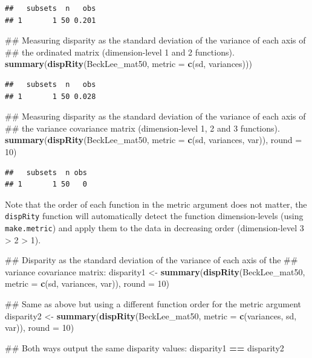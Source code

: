 \documentclass[]{book}
\newenvironment{Shaded}{\begin{snugshade}}{\end{snugshade}}
\newcommand{\KeywordTok}[1]{\textcolor[rgb]{0.13,0.29,0.53}{\textbf{#1}}}
\newcommand{\DataTypeTok}[1]{\textcolor[rgb]{0.13,0.29,0.53}{#1}}
\newcommand{\DecValTok}[1]{\textcolor[rgb]{0.00,0.00,0.81}{#1}}
\newcommand{\StringTok}[1]{\textcolor[rgb]{0.31,0.60,0.02}{#1}}
\newcommand{\OperatorTok}[1]{\textcolor[rgb]{0.81,0.36,0.00}{\textbf{#1}}}
\newcommand{\NormalTok}[1]{#1}
\theoremstyle{definition}
\theoremstyle{definition}
\theoremstyle{remark}
\begin{document}
\begin{verbatim}
##   subsets  n   obs
## 1       1 50 0.201
\end{verbatim}

\begin{Shaded}
\begin{Highlighting}[]
\NormalTok{## Measuring disparity as the standard deviation of the variance of each axis of}
\NormalTok{## the ordinated matrix (dimension-level 1 and 2 functions).}
\KeywordTok{summary}\NormalTok{(}\KeywordTok{dispRity}\NormalTok{(BeckLee_mat50, }\DataTypeTok{metric =} \KeywordTok{c}\NormalTok{(sd, variances)))}
\end{Highlighting}
\end{Shaded}

\begin{verbatim}
##   subsets  n   obs
## 1       1 50 0.028
\end{verbatim}

\begin{Shaded}
\begin{Highlighting}[]
\NormalTok{## Measuring disparity as the standard deviation of the variance of each axis of}
\NormalTok{## the variance covariance matrix (dimension-level 1, 2 and 3 functions).}
\KeywordTok{summary}\NormalTok{(}\KeywordTok{dispRity}\NormalTok{(BeckLee_mat50, }\DataTypeTok{metric =} \KeywordTok{c}\NormalTok{(sd, variances, var)), }\DataTypeTok{round =} \DecValTok{10}\NormalTok{)}
\end{Highlighting}
\end{Shaded}

\begin{verbatim}
##   subsets  n obs
## 1       1 50   0
\end{verbatim}

Note that the order of each function in the metric argument does not
matter, the \texttt{dispRity} function will automatically detect the
function dimension-levels (using \texttt{make.metric}) and apply them to
the data in decreasing order (dimension-level 3 \textgreater{} 2
\textgreater{} 1).

\begin{Shaded}
\begin{Highlighting}[]
\NormalTok{## Disparity as the standard deviation of the variance of each axis of the}
\NormalTok{## variance covariance matrix:}
\NormalTok{disparity1 <-}\StringTok{ }\KeywordTok{summary}\NormalTok{(}\KeywordTok{dispRity}\NormalTok{(BeckLee_mat50, }\DataTypeTok{metric =} \KeywordTok{c}\NormalTok{(sd, variances, var)),}
                      \DataTypeTok{round =} \DecValTok{10}\NormalTok{)}

\NormalTok{## Same as above but using a different function order for the metric argument}
\NormalTok{disparity2 <-}\StringTok{ }\KeywordTok{summary}\NormalTok{(}\KeywordTok{dispRity}\NormalTok{(BeckLee_mat50, }\DataTypeTok{metric =} \KeywordTok{c}\NormalTok{(variances, sd, var)),}
                      \DataTypeTok{round =} \DecValTok{10}\NormalTok{)}

\NormalTok{## Both ways output the same disparity values:}
\NormalTok{disparity1 }\OperatorTok{==}\StringTok{ }\NormalTok{disparity2}
\end{Highlighting}
\end{Shaded}
\end{document}
